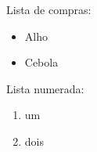 \documentclass[12pt]{article}
\begin{document}
Lista de compras:
\begin{itemize}
    \item Alho
    \item Cebola
\end{itemize}

Lista numerada:
\begin{enumerate}
    \item um
    \item dois
\end{enumerate}
\end{document}

